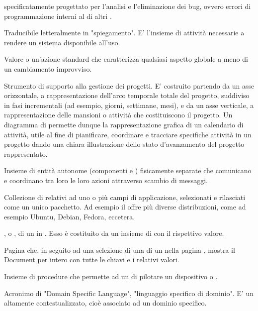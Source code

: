 { specificatamente progettato per l'analisi e l'eliminazione dei bug, ovvero errori di programmazione interni al  di altri .}


{Traducibile letteralmente in "spiegamento". E' l'insieme di attività necessarie a rendere un sistema  disponibile all'uso.}


{Valore o un'azione standard che caratterizza qualsiasi aspetto globale a meno di un cambiamento improvviso.}


{Strumento di supporto alla gestione dei progetti. E' costruito partendo da un asse orizzontale, a rappresentazione dell'arco temporale totale del progetto, suddiviso in fasi incrementali (ad esempio, giorni, settimane, mesi), e da un asse verticale, a rappresentazione delle mansioni o attività che costituiscono il progetto. Un diagramma di  permette dunque la rappresentazione grafica di un calendario di attività, utile al fine di pianificare, coordinare e tracciare specifiche attività in un progetto dando una chiara illustrazione dello stato d'avanzamento del progetto rappresentato.} 



{Insieme di entità autonome (componenti  e ) fisicamente separate che comunicano e coordinano tra loro le loro azioni attraverso scambio di messaggi.}

{Collezione di  relativi ad uno o più campi di applicazione, selezionati e rilasciati come un unico pacchetto. Ad esempio il   offre più diverse distribuzioni, come ad esempio Ubuntu, Debian, Fedora, eccetera.}

{, o , di un  in . Esso è costituito da un insieme di  con il rispettivo valore.}


{Pagina che, in seguito ad una selezione di una  di un  nella pagina , mostra il Document per intero con tutte le chiavi e i relativi valori.}

{Insieme di procedure che permette ad un  di pilotare un dispositivo  o .}

{Acronimo di "Domain Specific Language", "linguaggio specifico di dominio". E' un  altamente contestualizzato, cioè associato ad un dominio specifico.} 


